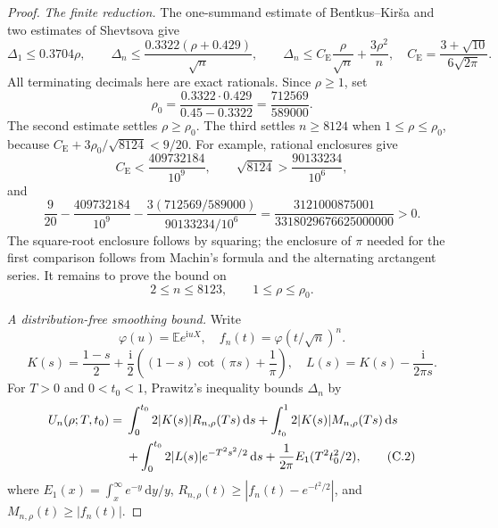 \documentclass[11pt,a4paper]{article}
\numberwithin{equation}{section}
\theoremstyle{definition}
\theoremstyle{remark}
\newcommand{\E}{\mathbb E}
\newcommand{\ii}{\mathrm i}
\newcommand{\dd}{\,\mathrm d}
\newcommand{\CE}{C_{\mathrm E}}
\newcommand{\D}{\Delta_n}
\begin{document}
\begin{proof}
\emph{The finite reduction.}
The one-summand estimate of Bentkus--Kir\v{s}a
\cite{BentkusKirsa1989} and two estimates of Shevtsova
\cite{Shevtsova2013,Shevtsova2012} give
\[
 \Delta_1\le0.3704\rho,\qquad
 \D\le\frac{0.3322(\rho+0.429)}{\sqrt n},\qquad
 \D\le \CE\frac{\rho}{\sqrt n}+\frac{3\rho^2}{n},
 \quad \CE=\frac{3+\sqrt{10}}{6\sqrt{2\pi}}.
\]
All terminating decimals here are exact rationals. Since \(\rho\ge1\), set
\[
 \rho_0=\frac{0.3322\cdot0.429}{0.45-0.3322}
       =\frac{712569}{589000}.
\]
The second estimate settles \(\rho\ge\rho_0\). The third settles
\(n\ge8124\) when \(1\le\rho\le\rho_0\), because
\(\CE+3\rho_0/\sqrt{8124}<9/20\). For example, rational enclosures give
\[
 \CE<\frac{409732184}{10^9},\qquad
 \sqrt{8124}>\frac{90133234}{10^6},
\]
and
\[
 \frac9{20}-\frac{409732184}{10^9}
 -\frac{3(712569/589000)}{90133234/10^6}
 =\frac{3121000875001}{3318029676625000000}>0.
\]
The square-root enclosure follows by squaring; the enclosure of \(\pi\)
needed for the first comparison follows from Machin's formula and the
alternating arctangent series. It remains to prove the bound on
\[
                 2\le n\le8123,\qquad 1\le\rho\le\rho_0.       \tag{C.1}
\]

\emph{A distribution-free smoothing bound.}
Write
\[
 \varphi(u)=\E e^{\ii uX},\quad
 f_n(t)=\varphi(t/\sqrt n)^n.
\]
\[
 K(s)=\frac{1-s}{2}+
       \frac{\ii}{2}\left((1-s)\cot(\pi s)+\frac1\pi\right),
 \quad L(s)=K(s)-\frac{\ii}{2\pi s}.
\]
For \(T>0\) and \(0<t_0<1\), Prawitz's inequality
\cite{Prawitz1972} bounds \(\D\) by
\begin{align}
 U_n(\rho;T,t_0)={}&
 \int_0^{t_0}2|K(s)|R_{n,\rho}(Ts)\dd s
 +\int_{t_0}^1 2|K(s)|M_{n,\rho}(Ts)\dd s \notag\\
 &+\int_0^{t_0}2|L(s)|e^{-T^2s^2/2}\dd s
 +\frac1{2\pi}E_1(T^2t_0^2/2),                         \tag{C.2}
\end{align}
where \(E_1(x)=\int_x^\infty e^{-y}\dd y/y\),
\(R_{n,\rho}(t)\ge|f_n(t)-e^{-t^2/2}|\), and
\(M_{n,\rho}(t)\ge|f_n(t)|\).


\end{proof}
\end{document}
